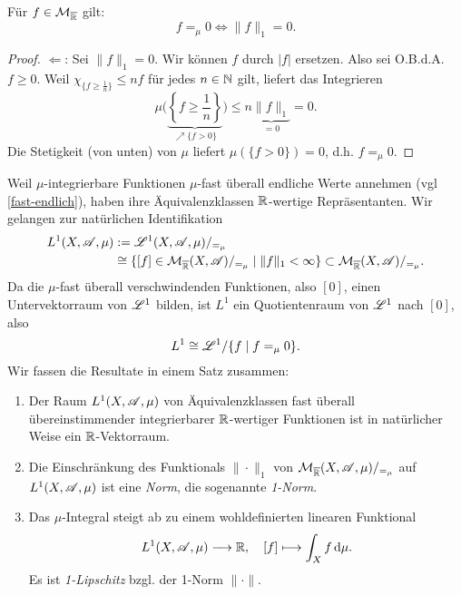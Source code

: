 \begin{lemma}
\begin{mdframed}
Für $f\in \MM_{\ol\R}$ gilt:
$$f=_\mu 0 \iff \|f\|_1 =0.$$
\end{mdframed}
\begin{proof}
$\Longleftarrow$: Sei $\|f\|_1=0$. Wir können $f$ durch $|f|$ ersetzen. Also sei O.B.d.A. $f\geq 0$. Weil $\chi_{\{f\geq \frac{1}{n}\}} \leq nf$ für jedes $n\in \N$ gilt, liefert das Integrieren
$$
\mu \Big( \underbrace{\left\{f\geq \frac{1}{n}\right\}}_{\nearrow \{f>0\}}\Big) \leq n \underbrace{\|f\|_1}_{=0} =0.
$$
Die Stetigkeit (von unten) von $\mu$ liefert $\mu(\{f>0\})=0$, d.h. $f=_\mu 0$.
\end{proof}
\end{lemma}
Weil $\mu$-integrierbare Funktionen $\mu$-fast überall endliche Werte annehmen (vgl \eqref{fast-endlich}), haben ihre Äquivalenzklassen $\R$-wertige Repräsentanten. Wir gelangen zur natürlichen Identifikation
\begin{equation*}
\begin{split}
L^1(X,\AA,\mu)&:=\LL^1 (X,\AA,\mu)/_{=_\mu}\\&\cong \{[f]\in\MM_{\ol\R}(X,\AA)/_{=_\mu} \mid \|f\|_1<\infty\} \subset\MM_{\ol\R}(X,\AA)/_{=_\mu}.
\end{split}
\end{equation*}
Da die $\mu$-fast überall verschwindenden Funktionen, also $[0]$, einen Untervektorraum von $\LL^1$ bilden, ist $L^1$ ein Quotientenraum von $\LL^1$ nach $[0]$, also
$$L^1 \cong \LL^1/{\{f\mid f=_\mu 0\}}.$$
Wir fassen die Resultate in einem Satz zusammen:
\begin{satz}\begin{mdframed}
\begin{enumerate}
\item Der Raum $L^1(X,\AA,\mu)$ von Äquivalenzklassen fast überall übereinstimmender integrierbarer $\R$-wertiger Funktionen ist in natürlicher Weise ein $\R$-Vektorraum.
\item Die Einschränkung des Funktionals $\|\cdot \|_1$ von $\MM_{\ol\R}(X,\AA,\mu)/_{=_\mu}$ auf $L^1(X,\AA,\mu)$ ist eine \emph{Norm}, die sogenannte \emph{1-Norm}.
\item Das $\mu$-Integral steigt ab zu einem wohldefinierten linearen Funktional
\begin{equation*}
L^1(X,\AA,\mu) \longrightarrow \R, \quad 
[f]  \longmapsto	 \int_X f \D\mu.
\end{equation*}
Es ist \emph{1-Lipschitz} bzgl. der 1-Norm $\|\cdot\|$.
\end{enumerate}
\end{mdframed}
\end{satz}

